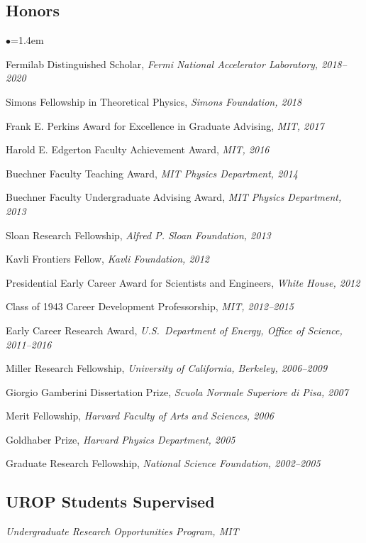 \documentclass[11pt]{article}
\newcommand{\heading}[1]{\vspace{0in}\subsection*{#1} \vspace{.02in}}
\newcommand{\bbl}{\begin{list}{$\bullet$}{\leftmargin=1.4em \itemsep=-1pt}}
\newcommand{\el}{\end{list}}
\begin{document}


\heading{Honors}

\bbl
\item Fermilab Distinguished Scholar, \textit{Fermi National Accelerator Laboratory, 2018--2020}
\item Simons Fellowship in Theoretical Physics, \textit{Simons Foundation, 2018}
\item Frank E. Perkins Award for Excellence in Graduate Advising, \textit{MIT, 2017}
\item Harold E. Edgerton Faculty Achievement Award, \textit{MIT, 2016}
\item Buechner Faculty Teaching Award, \textit{MIT Physics Department, 2014}
\item Buechner Faculty Undergraduate Advising Award, \textit{MIT Physics Department, 2013}
\item Sloan Research Fellowship, \textit{Alfred P. Sloan Foundation, 2013}
\item Kavli Frontiers Fellow, \textit{Kavli Foundation, 2012}
\item Presidential Early Career Award for Scientists and Engineers, \textit{White House, 2012}
\item Class of 1943 Career Development Professorship, \textit{MIT, 2012--2015}
\item Early Career Research Award, \textit{U.S.~Department of Energy, Office of Science, 2011--2016} 
\item Miller Research Fellowship, \textit{University of California, Berkeley, 2006--2009}
\item Giorgio Gamberini Dissertation Prize, \textit{Scuola Normale Superiore di Pisa, 2007}
\item Merit Fellowship, \textit{Harvard Faculty of Arts and Sciences, 2006}
\item Goldhaber Prize, \textit{Harvard Physics Department, 2005}
\item Graduate Research Fellowship, \textit{National Science Foundation, 2002--2005}
\el



\heading{UROP Students Supervised}
\vspace{-.1in}
\textit{Undergraduate Research Opportunities Program, MIT}
\end{document}
